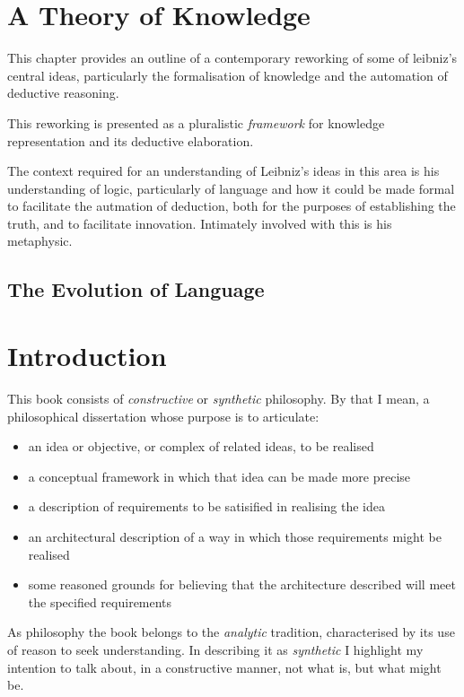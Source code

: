 \chapter{A Theory of Knowledge}\label{TheoryOfKnowledge}

This chapter provides an outline of a contemporary reworking of some of leibniz's central
ideas, particularly the formalisation of knowledge and the automation of deductive reasoning.

This reworking is presented as a pluralistic \emph{framework} for knowledge representation and its
deductive elaboration.

The context required for an understanding of Leibniz's ideas in this area is his
understanding of logic, particularly of language and how it could be made formal
to facilitate the autmation of deduction, both for the purposes of establishing
the truth, and to facilitate innovation.
Intimately involved with this is his metaphysic.

\section{The Evolution of Language}


\chapter{Introduction}\label{IntroductionA}


This book consists of {\it constructive} or {\it synthetic} philosophy.
By that I mean, a philosophical dissertation whose purpose is to articulate:

\begin{itemize}
\item an idea or objective, or complex of related ideas, to be realised
\item a conceptual framework in which that idea can be made more precise
\item a description of requirements to be satisified in realising the idea
\item an architectural description of a way in which those requirements might be realised
\item some reasoned grounds for believing that the architecture described will meet the specified requirements
\end{itemize}

As philosophy the book belongs to the {\it analytic} tradition, characterised by its use of reason to seek understanding.
In describing it as {\it synthetic} I highlight my intention to talk about, in a constructive manner, not what is, but what might be.


